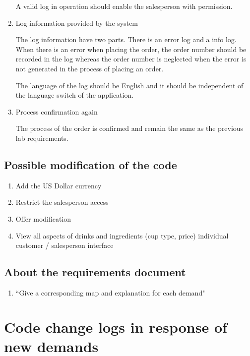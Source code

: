 \documentclass[a4paper]{report}
\begin{document}
\begin{enumerate}
\par
A valid log in operation should enable the salesperson with permission.
\item Log information provided by the system 
\par
The log information have two parts. There is an error log and a info log. When there is an error when placing the order, the order number should be recorded in the log whereas the order number is neglected when the error is not generated in the process of placing an order. 
\par
The language of the log should be English and it should be independent of the language switch of the application.
\item Process confirmation again
\par
The process of the order is confirmed and remain the same as the previous lab requirements.
\end{enumerate}
\subsection{Possible modification of the code}
\begin{enumerate}
\item Add the US Dollar currency 
\item Restrict the salesperson access 
\item Offer modification 
\item View all aspects of drinks and ingredients (cup type, price) individual customer / salesperson interface 
\end{enumerate}
\subsection{About the requirements document }
\begin{enumerate}
\item ``Give a corresponding map and explanation for each demand"
\end{enumerate}
\section{Code change logs in response of new demands}
\end{document}
